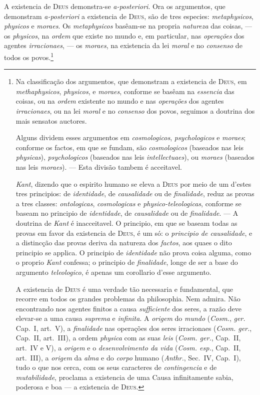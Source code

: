 A existencia de \textsc{Deus} demonstra-se \emph{a-posteriori}. Ora os argumentos, que
demonstram \emph{a-posteriori} a existencia de
 \textsc{Deus}, são de tres especies: \emph{metaphysicos}, \emph{physicos} e
\emph{moraes}. Os \emph{metaphysicos} basêam-se na propria \emph{natureza} das coisas,
--- os \emph{physicos}, na \emph{ordem} que existe no mundo e, em particular, nas
 \emph{operações} dos agentes \emph{irracionaes}, --- os \emph{moraes}, na
existencia da lei \emph{moral} e no \emph{consenso} de todos os povos.\footnote{Na classificação dos argumentos, que demonstram a existencia de \textsc{Deus}, em
\emph{methaphysicos}, \emph{physicos}, e \emph{moraes}, conforme se basêam na
\emph{essencia} das coisas, ou na \emph{ordem} existente no mundo e nas
\emph{operações} dos agentes \emph{irracionaes}, ou na lei \emph{moral} e no
\emph{consenso} dos povos, seguimos a doutrina dos mais sensatos auctores.

Alguns dividem esses argumentos em \emph{cosmologicos}, \emph{psychologicos} e
\emph{moraes}; conforme os factos, em que se fundam, são \emph{cosmologicos} (baseados
nas leis \emph{physicas}), \emph{psychologicos} (baseados nas leis
\emph{intellectuaes}), ou \emph{moraes} (baseados nas leis \emph{moraes}). --- Esta
divisão tambem é acceitavel.

\emph{Kant}, dizendo que o espirito humano se eleva a \textsc{Deus} por meio de um
d'estes tres principios: de \emph{identidade}, de \emph{causalidade} ou de
\emph{finalidade}, reduz as provas a tres classes: \emph{ontologicas},
\emph{cosmologicas} e \emph{physico-teleologicas}, conforme se baseam no principio de
\emph{identidade}, de \emph{causalidade} ou de \emph{finalidade}. --- A doutrina de
\emph{Kant} é inacceitavel. O principio, em que se baseam todas as provas em favor da
existencia de \textsc{Deus}, é um só: o \emph{principio de causalidade}, e a distincção
das provas deriva da natureza dos \emph{factos}, aos quaes o dito principio se applica.
O principio de \emph{identidade} não prova coisa alguma, como o proprio \emph{Kant}
confessa; o principio de \emph{finalidade}, longe de ser a base do argumento
\emph{teleologico}, é apenas um corollario d'esse argumento.

A existencia de \textsc{Deus} é uma verdade tão necessaria e fundamental, que recorre em
todos os grandes problemas da philosophia. Nem admira. Não encontrando nos agentes
finitos a causa \emph{sufficiente} dos seres, a razão deve elevar-se a uma causa
\emph{suprema} e \emph{infinita}. A \emph{origem} do \emph{mundo} (\emph{Cosm.},
\emph{ger.}
Cap.~I, art.~V), a \emph{finalidade} nas operações dos seres irracionaes (\emph{Cosm.
ger.}, Cap.~II, art.~III), a ordem \emph{physica} com as suas \emph{leis} (\emph{Cosm.
ger.}, Cap.~II, art.~IV e V), a \emph{origem} e o \emph{desenvolvimento da vida}
(\emph{Cosm. esp.}, Cap.~II, art.~III), a \emph{origem} da \emph{alma} e do
\emph{corpo} humano (\emph{Anthr.}, Sec.~IV, Cap.~I), tudo o que nos cerca, com os seus
caracteres de \emph{contingencia} e de \emph{mutabilidade}, proclama a existencia de uma
Causa infinitamente sabia, poderosa e boa --- a existencia de \textsc{Deus}.

}
